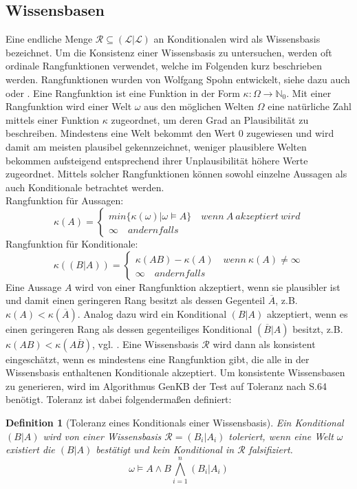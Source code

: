 \documentclass[12pt,a4paper]{article}
\newtheorem{theorem}{Definition}
\newcommand{\lag}{\mathcal{L}}
\begin{document}
\subsection{Wissensbasen}
\label{sec:wissensbasen}
Eine endliche Menge $\mathcal{R} \subseteq (\lag | \lag)$ an Konditionalen wird als Wissensbasis bezeichnet. Um die Konsistenz einer Wissensbasis zu untersuchen, werden oft ordinale Rangfunktionen verwendet, welche im Folgenden kurz beschrieben werden. Rangfunktionen wurden von Wolfgang Spohn entwickelt, siehe dazu auch \cite{spohn88} oder \cite{spohn12}. Eine Rangfunktion ist eine Funktion in der Form $\kappa :  \Omega \rightarrow \mathbb{N}_0 $. Mit einer Rangfunktion wird einer Welt $\omega$ aus den möglichen Welten $\Omega$ eine natürliche Zahl mittels einer Funktion $\kappa$ zugeordnet, um deren Grad an Plausibilität zu beschreiben. Mindestens eine Welt bekommt den Wert 0 zugewiesen und wird damit am meisten plausibel gekennzeichnet, weniger plausiblere Welten bekommen aufsteigend entsprechend ihrer Unplausibilität höhere Werte zugeordnet. Mittels solcher Rangfunktionen können sowohl einzelne Aussagen als auch Konditionale betrachtet werden.\\
Rangfunktion für Aussagen:
\[
 \kappa(A)=\begin{cases}
			min\{\kappa(\omega)|\omega \models A \} \quad wenn \  A \ akzeptiert \ wird \\
			\infty \quad andernfalls
            \end{cases}
\]
Rangfunktion für Konditionale:
\[
\kappa((B|A))=\begin{cases}
			\kappa(AB) - \kappa(A) \quad wenn \ \kappa(A) \neq \infty \\
			\infty \quad andernfalls
            \end{cases}
\]
Eine Aussage $A$ wird von einer Rangfunktion akzeptiert, wenn sie plausibler ist und damit einen geringeren Rang besitzt als dessen Gegenteil $\overline{A}$, z.B. $\kappa(A) < \kappa(\overline{A})$. Analog dazu wird ein Konditional $(B|A)$ akzeptiert, wenn es einen geringeren Rang als dessen gegenteiliges Konditional $(\overline{B}|A)$ besitzt, z.B. $\kappa(AB)<\kappa(A\overline{B})$, vgl. \cite{beierle17}. Eine Wissensbasis $\mathcal{R}$ wird dann als konsistent eingeschätzt, wenn es mindestens eine Rangfunktion gibt, die alle in der Wissensbasis enthaltenen Konditionale akzeptiert. Um konsistente Wissensbasen zu generieren, wird im Algorithmus GenKB der Test auf Toleranz nach \cite{goldszmidt96}S.64 benötigt. Toleranz ist dabei folgendermaßen definiert:
\begin{theorem}[Toleranz eines Konditionals einer Wissensbasis]
\label{def:toleranz}
Ein Konditional $(B|A)$ wird von einer Wissensbasis $\mathcal{R} = {(B_i|A_i)}$ toleriert, wenn eine Welt $\omega$ existiert die $(B|A)$ bestätigt und kein Konditional in $\mathcal{R}$ falsifiziert.
\begin{equation}
\omega \models A \wedge B \bigwedge^n_{i=1}(B_i|A_i)
\end{equation}
\end{theorem}
\end{document}
